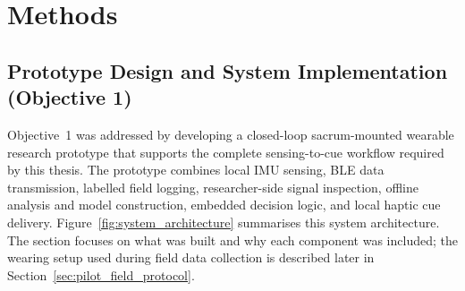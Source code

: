 \chapter{Methods}\label{ch:methods}

\section{Prototype Design and System Implementation (Objective 1)}

Objective~1 was addressed by developing a closed-loop sacrum-mounted wearable research prototype that supports the complete sensing-to-cue workflow required by this thesis. The prototype combines local IMU sensing, BLE data transmission, labelled field logging, researcher-side signal inspection, offline analysis and model construction, embedded decision logic, and local haptic cue delivery. Figure~\ref{fig:system_architecture} summarises this system architecture. The section focuses on what was built and why each component was included; the wearing setup used during field data collection is described later in Section~\ref{sec:pilot_field_protocol}.

